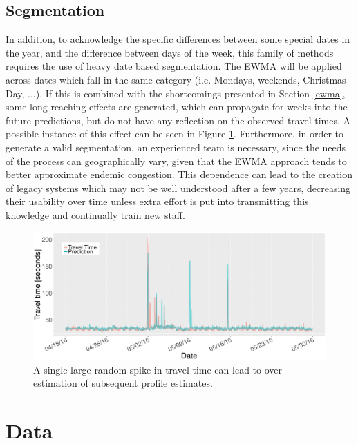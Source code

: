 \documentclass[letterpaper, 10 pt, conference]{ieeeconf}  %
\begin{document}
\subsection{Segmentation}\label{segmentation}
In addition, to acknowledge the specific differences between some special dates in the year, and the difference between days of the week, this family of methods requires the use of heavy date based segmentation. 
The EWMA will be applied across dates which fall in the same category (i.e. Mondays, weekends, Christmas Day, ...).
If this is combined with the shortcomings presented in Section \ref{ewma}, some long reaching effects are generated, which can propagate for weeks into the future predictions, but do not have any reflection on the observed travel times. A possible instance of this effect can be seen in Figure \ref{fig:EWMA_spike}.
Furthermore, in order to generate a valid segmentation, an experienced team is necessary, since the needs of the process can geographically vary, given that the EWMA approach tends to better approximate endemic congestion. 
This dependence can lead to the creation of legacy systems which may not be well understood after a few years, decreasing their usability over time unless extra effort is put into transmitting this knowledge and continually train new staff.
\begin{figure}
	\includegraphics[width=\linewidth]{EWMA.pdf}
	\caption{A single large random spike in travel time can lead to over-estimation of subsequent profile estimates.}
	\label{fig:EWMA_spike}
\end{figure}
\section{Data}
\end{document}
